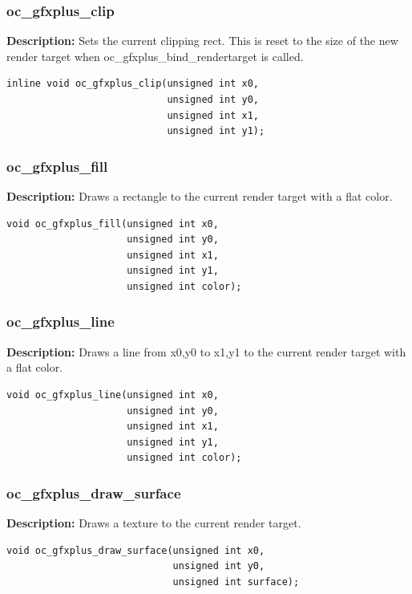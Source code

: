 \documentclass[10pt,a4paper]{article}
\begin{document}
\subsubsection{oc\_gfxplus\_clip}
\textbf{Description:} Sets the current clipping rect. This is reset to the size of the new render target when oc\_gfxplus\_bind\_rendertarget is called.
\begin{lstlisting}
inline void oc_gfxplus_clip(unsigned int x0,
                            unsigned int y0,
                            unsigned int x1,
                            unsigned int y1);
\end{lstlisting}

\subsubsection{oc\_gfxplus\_fill}
\textbf{Description:} Draws a rectangle to the current render target with a flat color.
\begin{lstlisting}
void oc_gfxplus_fill(unsigned int x0,
                     unsigned int y0,
                     unsigned int x1,
                     unsigned int y1,
                     unsigned int color);
\end{lstlisting}

\subsubsection{oc\_gfxplus\_line}
\textbf{Description:} Draws a line from x0,y0 to x1,y1 to the current render target with a flat color.
\begin{lstlisting}
void oc_gfxplus_line(unsigned int x0,
                     unsigned int y0,
                     unsigned int x1,
                     unsigned int y1,
                     unsigned int color);
\end{lstlisting}

\subsubsection{oc\_gfxplus\_draw\_surface}
\textbf{Description:} Draws a texture to the current render target.
\begin{lstlisting}
void oc_gfxplus_draw_surface(unsigned int x0,
                             unsigned int y0,
                             unsigned int surface);
\end{lstlisting}
\end{document}
